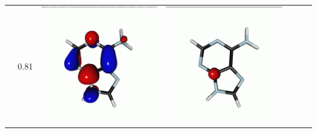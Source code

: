 \documentclass[journal=jctcce,manuscript=article]{achemso}
\begin{document}
\begin{table}[H]
\begin{tabular}{ l| c c c | c c c }
\begin{minipage}{0.2\textwidth}
    \end{minipage}
    & 0.81
    &  \begin{minipage}{0.2\textwidth}
        \centering
        \includegraphics[scale=0.10]{NTO/Adenine_C/6p_C1.png}
    \end{minipage}
    & 
    \begin{minipage}{0.2\textwidth}
        \centering
        \includegraphics[scale=0.10]{NTO/Adenine_C/6h_Cs.png}

\end{minipage}
\end{tabular}
\end{table}
\end{document}
